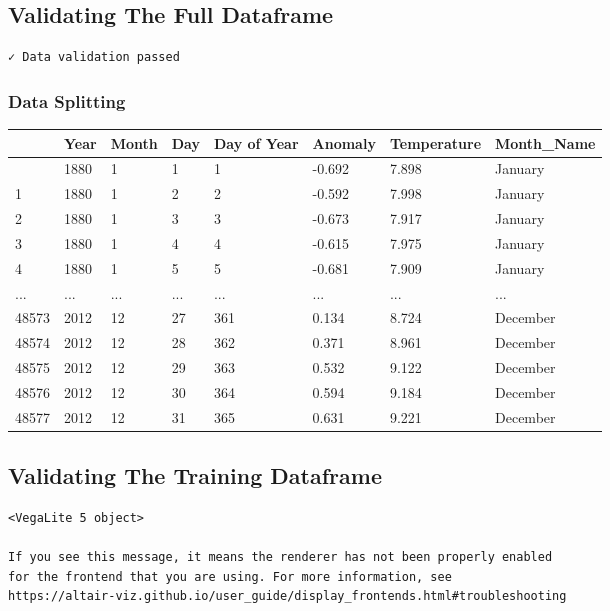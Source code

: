 \documentclass[
  letterpaper,
  DIV=11,
  numbers=noendperiod]{scrartcl}
\begin{document}
\subsection{Validating The Full
Dataframe}\label{validating-the-full-dataframe}

\begin{verbatim}
✓ Data validation passed
\end{verbatim}

\subsubsection{Data Splitting}\label{data-splitting}

\begin{longtable}[]{@{}llllllll@{}}
\toprule\noalign{}
& Year & Month & Day & Day of Year & Anomaly & Temperature &
Month\_Name \\
\midrule\noalign{}
\endhead
\bottomrule\noalign{}
\endlastfoot
0 & 1880 & 1 & 1 & 1 & -0.692 & 7.898 & January \\
1 & 1880 & 1 & 2 & 2 & -0.592 & 7.998 & January \\
2 & 1880 & 1 & 3 & 3 & -0.673 & 7.917 & January \\
3 & 1880 & 1 & 4 & 4 & -0.615 & 7.975 & January \\
4 & 1880 & 1 & 5 & 5 & -0.681 & 7.909 & January \\
... & ... & ... & ... & ... & ... & ... & ... \\
48573 & 2012 & 12 & 27 & 361 & 0.134 & 8.724 & December \\
48574 & 2012 & 12 & 28 & 362 & 0.371 & 8.961 & December \\
48575 & 2012 & 12 & 29 & 363 & 0.532 & 9.122 & December \\
48576 & 2012 & 12 & 30 & 364 & 0.594 & 9.184 & December \\
48577 & 2012 & 12 & 31 & 365 & 0.631 & 9.221 & December \\
\end{longtable}

\subsection{Validating The Training
Dataframe}\label{validating-the-training-dataframe}

\begin{verbatim}
<VegaLite 5 object>

If you see this message, it means the renderer has not been properly enabled
for the frontend that you are using. For more information, see
https://altair-viz.github.io/user_guide/display_frontends.html#troubleshooting
\end{verbatim}
\end{document}
